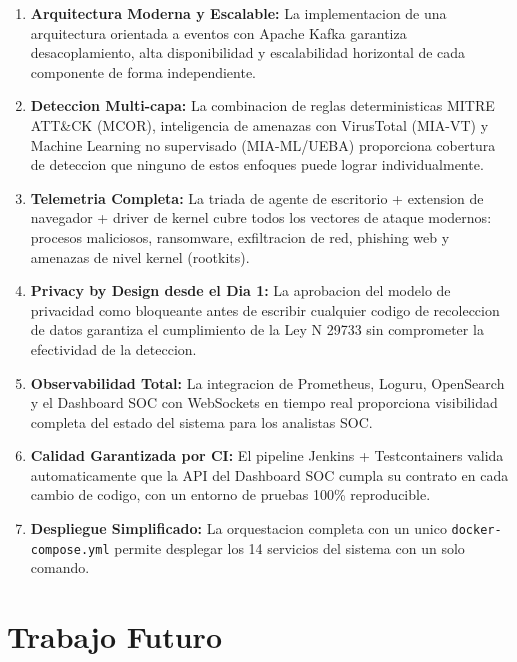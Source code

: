 \documentclass[12pt, a4paper]{report}
\begin{document}
\begin{enumerate}[leftmargin=2em]
    \item \textbf{Arquitectura Moderna y Escalable:} La implementacion de una arquitectura orientada a eventos con Apache Kafka garantiza desacoplamiento, alta disponibilidad y escalabilidad horizontal de cada componente de forma independiente.

    \item \textbf{Deteccion Multi-capa:} La combinacion de reglas deterministicas MITRE ATT\&CK (MCOR), inteligencia de amenazas con VirusTotal (MIA-VT) y Machine Learning no supervisado (MIA-ML/UEBA) proporciona cobertura de deteccion que ninguno de estos enfoques puede lograr individualmente.

    \item \textbf{Telemetria Completa:} La triada de agente de escritorio + extension de navegador + driver de kernel cubre todos los vectores de ataque modernos: procesos maliciosos, ransomware, exfiltracion de red, phishing web y amenazas de nivel kernel (rootkits).

    \item \textbf{Privacy by Design desde el Dia 1:} La aprobacion del modelo de privacidad como bloqueante antes de escribir cualquier codigo de recoleccion de datos garantiza el cumplimiento de la Ley N\textdegree{} 29733 sin comprometer la efectividad de la deteccion.

    \item \textbf{Observabilidad Total:} La integracion de Prometheus, Loguru, OpenSearch y el Dashboard SOC con WebSockets en tiempo real proporciona visibilidad completa del estado del sistema para los analistas SOC.

    \item \textbf{Calidad Garantizada por CI:} El pipeline Jenkins + Testcontainers valida automaticamente que la API del Dashboard SOC cumpla su contrato en cada cambio de codigo, con un entorno de pruebas 100\% reproducible.

    \item \textbf{Despliegue Simplificado:} La orquestacion completa con un unico \texttt{docker-compose.yml} permite desplegar los 14 servicios del sistema con un solo comando.
\end{enumerate}

\section{Trabajo Futuro}
\end{document}
